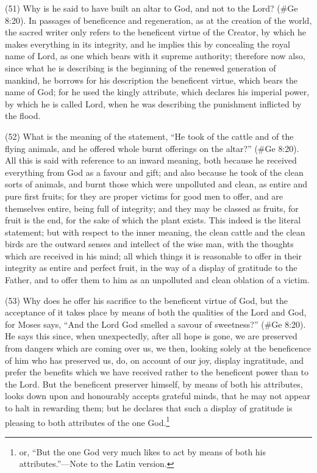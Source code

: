 (51) Why is he said to have built an altar to God, and not to the Lord? (\#Ge 8:20). In passages
of beneficence and regeneration, as at the creation of the world, the sacred writer only refers to
the beneficent virtue of the Creator, by which he makes everything in its integrity, and he implies
this by concealing the royal name of Lord, as one which bears with it supreme authority; therefore
now also, since what he is describing is the beginning of the renewed generation of mankind, he
borrows for his description the beneficent virtue, which bears the name of God; for he used the
kingly attribute, which declares his imperial power, by which he is called Lord, when he was
describing the punishment inflicted by the flood.

(52) What is the meaning of the statement, ``He took of the cattle and of the flying animals, and he
offered whole burnt offerings on the altar?'' (\#Ge 8:20). All this is said with reference to an
inward meaning, both because he received everything from God as a favour and gift; and also
because he took of the clean sorts of animals, and burnt those which were unpolluted and clean,
as entire and pure first fruits; for they are proper victims for good men to offer, and are themselves
entire, being full of integrity; and they may be classed as fruits, for fruit is the end, for the sake of
which the plant exists. This indeed is the literal statement; but with respect to the inner meaning, the
clean cattle and the clean birds are the outward senses and intellect of the wise man, with the
thoughts which are received in his mind; all which things it is reasonable to offer in their integrity as
entire and perfect fruit, in the way of a display of gratitude to the Father, and to offer them to him
as an unpolluted and clean oblation of a victim.

(53) Why does he offer his sacrifice to the beneficent virtue of God, but the acceptance of it takes
place by means of both the qualities of the Lord and God, for Moses says, ``And the Lord God
smelled a savour of sweetness?'' (\#Ge 8:20). He says this since, when unexpectedly, after all
hope is gone, we are preserved from dangers which are coming over us, we then, looking solely at
the beneficence of him who has preserved us, do, on account of our joy, display ingratitude, and
prefer the benefits which we have received rather to the beneficent power than to the Lord. But the
beneficent preserver himself, by means of both his attributes, looks down upon and honourably
accepts grateful minds, that he may not appear to halt in rewarding them; but he declares that such
a display of gratitude is pleasing to both attributes of the one God.\footnote{or, ``But the one God very much likes
to act by means of both his attributes.''—Note to the Latin version.}


